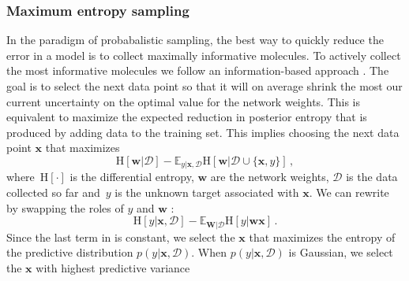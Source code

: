 \subsubsection{Maximum entropy sampling}

In the paradigm of probabalistic sampling, the best way to quickly reduce the error in a model is to collect maximally informative molecules. To actively collect the most informative molecules we follow an information-based approach \cite{MacKay_1992}. The goal
is to select the next data point so that it will on average shrink the most our current uncertainty on the optimal value for the network weights. This is equivalent to maximize the expected reduction in posterior entropy that is produced by adding data to the training set. This implies choosing the next data point $\mathbf{x}$ that maximizes
\begin{equation}
\text{H}[\mathbf{w}|\mathcal{D}] - 
\mathbb{E}_{y|\mathbf{x},\mathcal{D}}\text{H}[\mathbf{w}|\mathcal{D}\cup\{\mathbf{x},y\}]\,,\label{eq:acq_func}
\end{equation}
where~$\text{H}[\cdot]$ is the differential entropy, $\mathbf{w}$ are the network weights, $\mathcal{D}$ is the data collected so far and~$y$ is the unknown target associated with $\mathbf{x}$. We can rewrite  by swapping the roles of $y$ and $\mathbf{w}$ \cite{houlsby2012collaborative}:
\begin{equation}
\text{H}[y | \mathbf{x},\mathcal{D}] - 
\mathbb{E}_{\mathbf{W} | \mathcal{D}}\text{H}[y | \mathbf{w}\mathbf{x}]\,.\label{eq:new_acquisition_function}
\end{equation}
Since the last term in is constant, we select the $\mathbf{x}$ that maximizes the entropy of the predictive distribution $p(y| \mathbf{x},\mathcal{D})$. When $p(y| \mathbf{x},\mathcal{D})$ is Gaussian, we select the $\mathbf{x}$ with highest predictive variance